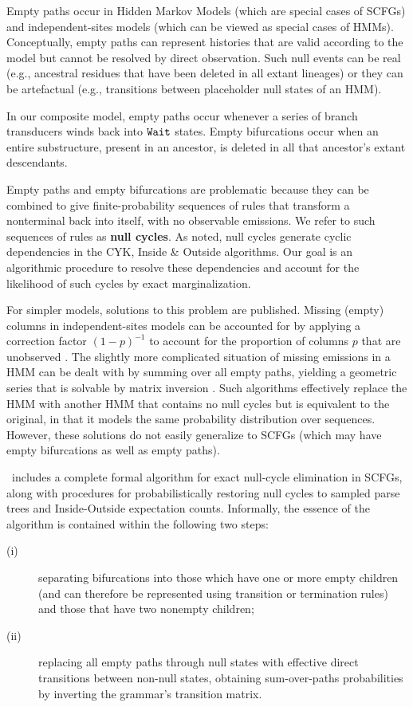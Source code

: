 \documentclass[10pt]{article}
\begin{document}
Empty paths occur in Hidden Markov Models (which are special cases of SCFGs)
and independent-sites models (which can be viewed as special cases of HMMs).
Conceptually, empty paths can represent histories that are valid
according to the model but cannot be resolved by direct observation.
Such null events can be real (e.g., ancestral residues that have been deleted in all extant lineages)
or they can be artefactual (e.g., transitions between placeholder null states of an HMM).

In our composite model, empty paths occur whenever a series of branch transducers winds back into $\mathtt{Wait}$ states.
Empty bifurcations occur when an entire substructure, present in an ancestor, is deleted in all that ancestor's extant descendants.

Empty paths and empty bifurcations are problematic because they can be combined to give finite-probability sequences of rules
that transform a nonterminal back into itself, with no observable emissions.
We refer to such sequences of rules as {\bf null cycles}.
As noted, null cycles generate cyclic dependencies in the CYK, Inside \& Outside algorithms.
Our goal is an algorithmic procedure to resolve these dependencies and account for the likelihood of such cycles by exact marginalization.

For simpler models, solutions to this problem are published.
Missing (empty) columns in independent-sites models can be accounted for by applying a correction factor $(1-p)^{-1}$
to account for the proportion of columns $p$ that are unobserved \cite{RivasEddy2008}.
The slightly more complicated situation of missing emissions in a HMM can be dealt with by
summing over all empty paths, yielding a geometric series that is solvable by matrix inversion
\cite{Holmes2003,Holmes2007,Lunter2007}.
Such algorithms
effectively replace the HMM
with another HMM that contains no null cycles but is equivalent to the original, in that it models the
same probability distribution over sequences.
However, these solutions do not easily generalize to SCFGs
(which may have empty bifurcations as well as empty paths).

\ includes a complete formal algorithm for exact null-cycle elimination in SCFGs,
along with procedures for probabilistically restoring null cycles
to sampled parse trees and Inside-Outside expectation counts.
Informally, the essence of the algorithm is contained within the following two steps:
\begin{description}
\item[(i)] separating bifurcations
into those which have one or more empty children (and can therefore be
represented using transition or termination rules) and those that have
two nonempty children;
\item[(ii)] replacing all empty paths through null states with effective direct transitions between non-null states,
obtaining sum-over-paths probabilities by inverting the grammar's transition matrix.
\end{description}
\end{document}
